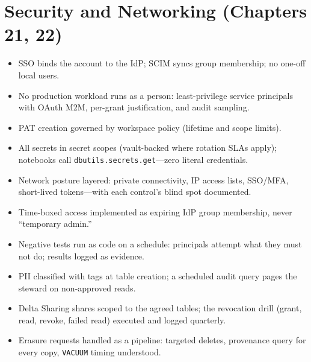 \section{Security and Networking (Chapters 21, 22)}
%
\begin{itemize}
    \item[$\square$] SSO binds the account to the IdP; SCIM syncs group membership; no one-off
    local users.
    \item[$\square$] No production workload runs as a person: least-privilege service principals
    with OAuth M2M, per-grant justification, and audit sampling.
    \item[$\square$] PAT creation governed by workspace policy (lifetime and scope limits).
    \item[$\square$] All secrets in secret scopes (vault-backed where rotation SLAs apply);
    notebooks call \texttt{dbutils.secrets.get}---zero literal credentials.
    \item[$\square$] Network posture layered: private connectivity, IP access lists, SSO/MFA,
    short-lived tokens---with each control's blind spot documented.
    \item[$\square$] Time-boxed access implemented as expiring IdP group membership, never
    ``temporary admin.''
    \item[$\square$] Negative tests run as code on a schedule: principals attempt what they must
    not do; results logged as evidence.
    \item[$\square$] PII classified with tags at table creation; a scheduled audit query pages
    the steward on non-approved reads.
    \item[$\square$] Delta Sharing shares scoped to the agreed tables; the revocation drill
    (grant, read, revoke, failed read) executed and logged quarterly.
    \item[$\square$] Erasure requests handled as a pipeline: targeted deletes, provenance query
    for every copy, \texttt{VACUUM} timing understood.
\end{itemize}

